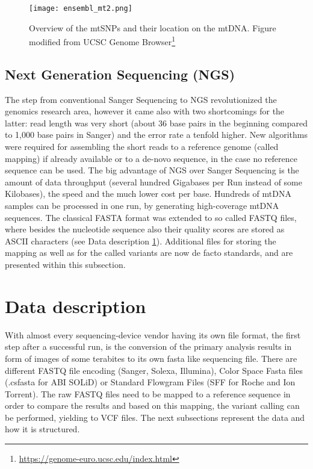 \begin{figure}[ht]
\begin{center}
\texttt{[image: ensembl\_mt2.png]}
\caption[mtSNPs location on mtDNA]{Overview of the mtSNPs and their location on the mtDNA. Figure modified from UCSC Genome Browser\footnote{\url{https://genome-euro.ucsc.edu/index.html}}}
\label{fig:figureSNPlocation}
\end{center}
\end{figure}

\subsection{Next Generation Sequencing (NGS)}
The step from conventional Sanger Sequencing to NGS revolutionized the genomics research area, however it came also with two shortcomings for the latter: read length was very short (about 36 base pairs\cite{Li2013a} in the beginning compared to 1,000 base pairs in Sanger) and the error rate a tenfold higher. New algorithms were required for assembling the short reads to a reference genome (called mapping) if already available or to a de-novo sequence, in the case no reference sequence can be used. The big advantage of NGS over Sanger Sequencing is the amount of data throughput (several hundred Gigabases per Run instead of some Kilobases), the speed and the much lower cost per base. Hundreds of mtDNA samples can be processed in one run, by generating high-coverage mtDNA sequences. 
The classical FASTA format was extended to so called FASTQ files, where besides the nucleotide sequence also their quality scores are stored as ASCII characters (see Data description \ref{datadescription}). Additional files for storing the mapping as well as for the called variants are now de facto standards, and are presented within this subsection. 
\section{Data description}\label{datadescription}
With almost every sequencing-device vendor having its own file format, the first step after a successful run, is the conversion of the primary analysis results in form of images of some terabites to its own fasta like sequencing file. There are different FASTQ file encoding (Sanger, Solexa, Illumina), Color Space Fasta files (.csfasta for ABI SOLiD) or Standard Flowgram Files (SFF for Roche and Ion Torrent). The raw FASTQ files need to be mapped to a reference sequence in order to compare the results and based on this mapping, the variant calling can be performed, yielding to VCF files. The next subsections represent the data and how it is structured. 
